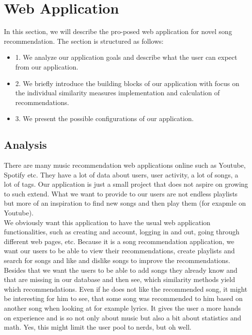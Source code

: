 \chapter{Web Application}\label{chap:web_app}

In this section, we will describe the pro-posed web application for novel song recommendation.  The section is structured as follows: 
\begin{itemize}
    \item 1. We analyze our application goals and describe what the user can expect from our application.
    \item 2. We briefly introduce the building blocks of our application with focus on the individual similarity measures implementation and calculation of recommendations.
    \item 3. We present the possible configurations of our application.
\end{itemize}

\section{Analysis}

There are many music recommendation web applications online such as Youtube, Spotify etc. They have a lot of data about users, user activity, a lot of songs, a lot of tags. Our application is just a small project that does not aspire on growing to such extend. What we want to provide to our users are not endless playlists but more of an inspiration to find new songs and then play them (for exapmle on Youtube). \\
We obviously want this application to have the usual web application functionalities, such as creating and account, logging in and out, going through different web pages, etc. Because it is a song recommendation application, we want our users to be able to view their recommendations, create playlists and search for songs and like and dislike songs to improve the recommendations. Besides that we want the users to be able to add songs they already know and that are missing in our database and then see, which similarity methods yield which recommendations. Even if he does not like the recommended song, it might be interesting for him to see, that some song was recommended to him based on another song when looking at for example lyrics. It gives the user a more hands on experience and is so not only about music but also a bit about statistics and math. Yes, this might limit the user pool to nerds, but oh well.\\

